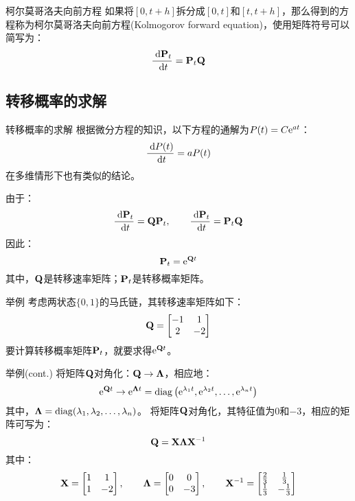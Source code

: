 \documentclass[t]{beamer}
\newcommand{\dif}{{\;\rm d}}
\begin{document}
\begin{frame}{柯尔莫哥洛夫向前方程}
  如果将$[0,t+h]$拆分成$[0,t]$和$[t,t+h]$，那么得到的方程称为柯尔莫哥洛夫向前方程(Kolmogorov forward equation)，使用矩阵符号可以简写为：
  \[\frac{\dif {\bf P}_t}{\dif t}={\bf P}_t {\bf Q}\]
  
\end{frame}


\subsection{转移概率的求解}
\begin{frame}{转移概率的求解}
  根据微分方程的知识，以下方程的通解为$P(t)=C{\rm e}^{at}$：
  \[\frac{\dif P(t)}{\dif t}=aP(t) \]
  在多维情形下也有类似的结论。
  
  由于：
  \[\frac{\dif {\bf P}_t}{\dif t}={\bf Q}{\bf P}_t,\qquad \frac{\dif {\bf P}_t}{\dif t}={\bf P}_t {\bf Q} \]
  因此：
  \begin{equation*}
  {\bf P}_t={\rm e}^{{\bf Q}t}
  \end{equation*}
  其中，${\bf Q}$是转移速率矩阵；${\bf P}_t$是转移概率矩阵。
\end{frame}


\begin{frame}{举例}
  考虑两状态$\{0,1\}$的马氏链，其转移速率矩阵如下：
	\[{\bf Q}=\begin{bmatrix}
	-1&1\\
	2&-2
	\end{bmatrix} \]
	要计算转移概率矩阵${\bf P}_t$，就要求得${\rm e}^{{\bf Q}t}$。
\end{frame}

\begin{frame}{举例(cont.)}
  将矩阵${\bf Q}$对角化：${\bf Q}\to \bm{\Lambda}$，相应地：
	\[{\rm e}^{{\bf Q}t}\to {\rm e}^{\bm{\Lambda}t}={\rm diag}\left( {\rm e}^{\lambda_1 t},{\rm e}^{\lambda_2 t},\ldots,{\rm e}^{\lambda_n t}\right)  \]
	其中，$\bm{\Lambda}={\rm diag}(\lambda_1, \lambda_2,\ldots,\lambda_n)$。
将矩阵${\bf Q}$对角化，其特征值为$0$和$-3$，相应的矩阵可写为：
\[{\bf Q}={\bf X}\bm{\Lambda}{\bf X}^{-1} \]
其中：
\[{\bf X}=\begin{bmatrix}
1&1\\1&-2
\end{bmatrix},\qquad \bm{\Lambda}=\begin{bmatrix}
0&0\\0&-3
\end{bmatrix},\qquad {\bf X}^{-1}=\begin{bmatrix}
\frac{2}{3}&\frac{1}{3}\\\frac{1}{3}&-\frac{1}{3}
\end{bmatrix} \]
\end{frame}
\end{document}
